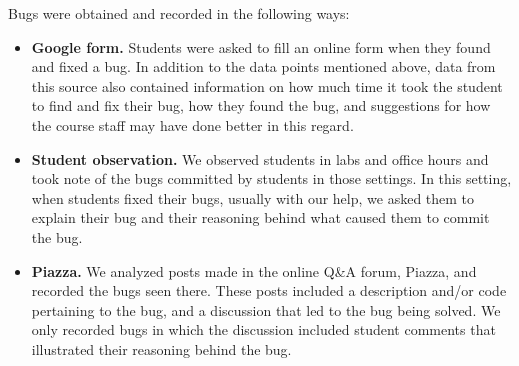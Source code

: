 \documentclass{sig-alternate}
\begin{document}
Bugs were obtained and recorded in the following ways:
\begin{itemize}
\item{\textbf{Google form.} Students were asked to fill an online form when they found and fixed a bug. In addition to the data points mentioned above, data from this source also contained information on how much time it took the student to find and fix their bug, how they found the bug, and suggestions for how the course staff may have done better in this regard.} %


\item{\textbf{Student observation.} We observed students in labs and office hours and took note of the bugs committed by students in those settings. In this setting, when students fixed their bugs, usually with our help, we asked them to explain their bug and their reasoning behind what caused them to commit the bug.}
\item{\textbf{Piazza.} We analyzed posts made in the online Q\&A forum, Piazza, and recorded the bugs seen there. These posts included a description and/or code pertaining to the bug, and a discussion that led to the bug being solved. We only recorded bugs in which the discussion included student comments that illustrated their reasoning behind the bug.}
\end{itemize}
\end{document}
